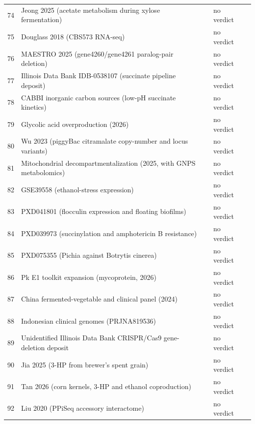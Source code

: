 \begin{longtable}{@{}r L{76mm} L{20mm} L{36mm} L{24mm}@{}}
74 & Jeong 2025 (acetate metabolism during xylose fermentation) &  & no verdict &  \\
75 & Douglass 2018 (CBS573 RNA-seq) &  & no verdict &  \\
76 & MAESTRO 2025 (gene4260/gene4261 paralog-pair deletion) &  & no verdict &  \\
77 & Illinois Data Bank IDB-0538107 (succinate pipeline deposit) &  & no verdict &  \\
78 & CABBI inorganic carbon sources (low-pH succinate kinetics) &  & no verdict &  \\
79 & Glycolic acid overproduction (2026) &  & no verdict &  \\
80 & Wu 2023 (piggyBac citramalate copy-number and locus variants) &  & no verdict &  \\
81 & Mitochondrial decompartmentalization (2025, with GNPS metabolomics) &  & no verdict &  \\
82 & GSE39558 (ethanol-stress expression) &  & no verdict &  \\
83 & PXD041801 (flocculin expression and floating biofilms) &  & no verdict &  \\
84 & PXD039973 (succinylation and amphotericin B resistance) &  & no verdict &  \\
85 & PXD075355 (Pichia against Botrytis cinerea) &  & no verdict &  \\
86 & Pk E1 toolkit expansion (mycoprotein, 2026) &  & no verdict &  \\
87 & China fermented-vegetable and clinical panel (2024) &  & no verdict &  \\
88 & Indonesian clinical genomes (PRJNA819536) &  & no verdict &  \\
89 & Unidentified Illinois Data Bank CRISPR/Cas9 gene-deletion deposit &  & no verdict &  \\
90 & Jia 2025 (3-HP from brewer's spent grain) &  & no verdict &  \\
91 & Tan 2026 (corn kernels, 3-HP and ethanol coproduction) &  & no verdict &  \\
92 & Liu 2020 (PPiSeq accessory interactome) &  & no verdict &  \\

\end{longtable}

